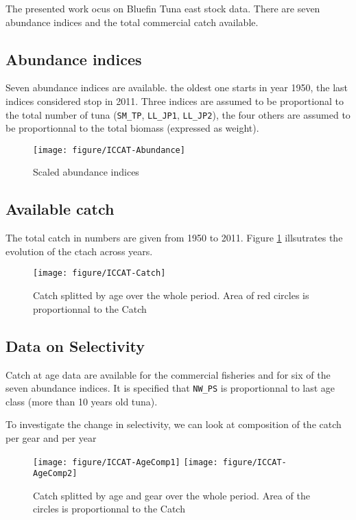 The presented  work ocus on  Bluefin Tuna  east stock data.  There are
seven abundance indices and the total commercial catch available. 





\subsection{Abundance indices}

Seven abundance indices are available.   the oldest one starts in year
1950,  the last  indices considered  stop in  2011. Three  indices are
assumed to be proportional to  the total number of tuna (\verb+SM_TP+,
\verb+LL_JP1+,  \verb+LL_JP2+),  the four  others  are  assumed to  be
proportionnal to the total biomass (expressed as weight).

\begin{figure}
{\centering \texttt{[image: figure/ICCAT-Abundance]} 
}
\caption{Scaled abundance indices }
\end{figure}




\subsection{Available catch}
The  total catch  in  numbers  are given  from  1950  to 2011.  Figure
\ref{fig:TotCatch} illsutrates the evolution of the ctach across years.
\begin{figure}
\centering \texttt{[image: figure/ICCAT-Catch]} 
\caption{Catch  splitted by  age over  the whole  period. Area  of red
  circles is proportionnal to the Catch}
\label{fig:TotCatch}
\end{figure}


\subsection{Data on Selectivity}
Catch at age  data are available for the commercial  fisheries and for
six of the seven abundance  indices. It is specified that \verb+NW_PS+
is proportionnal to last age class (more than 10 years old tuna).




To investigate the  change in selectivity, we can  look at composition
of the catch per gear and per year
\begin{figure}
{\centering \texttt{[image: figure/ICCAT-AgeComp1]} 
}
{\centering \texttt{[image: figure/ICCAT-AgeComp2]} 
}
\caption{Catch splitted by age and gear over the whole period. Area of the
  circles is proportionnal to the Catch}
\end{figure}




